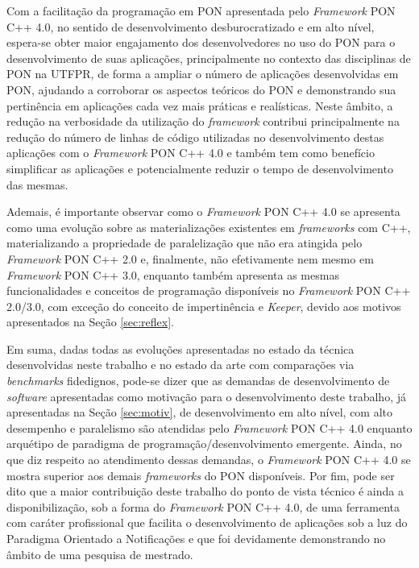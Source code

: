 Com a facilitação da programação em PON apresentada pelo \textit{Framework} PON
C++ 4.0, no sentido de desenvolvimento desburocratizado e em alto nível,
espera-se obter maior engajamento dos desenvolvedores no uso do PON para o
desenvolvimento de suas aplicações, principalmente no contexto das disciplinas
de PON na UTFPR, de forma a ampliar o número de aplicações desenvolvidas em PON,
ajudando a corroborar os aspectos teóricos do PON e demonstrando sua pertinência
em aplicações cada vez mais práticas e realísticas. Neste âmbito, a redução na
verbosidade da utilização do \textit{framework} contribui principalmente na
redução do número de linhas de código utilizadas no desenvolvimento destas
aplicações com o \textit{Framework} PON C++ 4.0 e também tem como benefício
simplificar as aplicações e potencialmente reduzir o tempo de desenvolvimento
das mesmas.

Ademais, é importante observar como o \textit{Framework} PON C++ 4.0 se
apresenta como uma evolução sobre as materializações existentes em
\textit{frameworks} com C++, materializando a propriedade de paralelização que
não era atingida pelo \textit{Framework} PON C++ 2.0 e, finalmente, não
efetivamente nem mesmo em \textit{Framework} PON C++ 3.0, enquanto também
apresenta as mesmas funcionalidades e conceitos de programação disponíveis no
\textit{Framework} PON C++ 2.0/3.0, com exceção do conceito de impertinência e
\textit{Keeper}, devido aos motivos apresentados na Seção \ref{sec:reflex}.

Em suma, dadas todas as evoluções apresentadas no estado da técnica
desenvolvidas neste trabalho e no estado da arte com comparações via
\textit{benchmarks} fidedignos, pode-se dizer que as demandas de desenvolvimento
de \textit{software} apresentadas como motivação para o desenvolvimento deste
trabalho, já apresentadas na Seção \ref{sec:motiv}, de desenvolvimento em alto
nível, com alto desempenho e paralelismo são atendidas pelo \textit{Framework}
PON C++ 4.0 enquanto arquétipo de paradigma de programação/desenvolvimento
emergente. Ainda, no que diz respeito ao atendimento dessas demandas, o
\textit{Framework} PON C++ 4.0 se mostra superior aos demais \textit{frameworks}
do PON disponíveis. Por fim, pode ser dito que a maior contribuição deste
trabalho do ponto de vista técnico é ainda a disponibilização, sob a forma do
\textit{Framework} PON C++ 4.0, de uma ferramenta com caráter profissional que
facilita o desenvolvimento de aplicações sob a luz do Paradigma Orientado a
Notificações e que foi devidamente demonstrando no âmbito de uma pesquisa de
mestrado.

